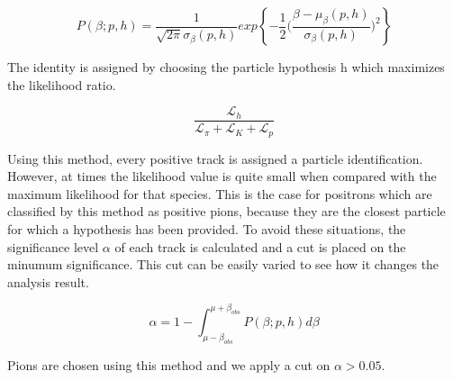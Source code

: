 \begin{equation}
  P(\beta;p,h) = \frac{1}{\sqrt{2 \pi} \sigma_\beta(p,h) } exp \left \{ -\frac{1}{2} \bigg( \frac{\beta - \mu_\beta(p,h)}{\sigma_\beta(p,h)} \bigg)^2 \right \}
\end{equation}

The identity is assigned by choosing the particle hypothesis h which maximizes the likelihood ratio.

\begin{equation}
  \frac{\mathcal{L}_h}{\mathcal{L}_{\pi}+\mathcal{L}_{K}+\mathcal{L}_{p}}
\end{equation}

Using this method, every positive track is assigned a particle identification.  However, at times the likelihood value is quite small when compared with the maximum likelihood for that species.  This is the case for positrons which are classified by this method as positive pions, because they are the closest particle for which a hypothesis has been provided.  To avoid these situations, the significance level $\alpha$ of each track is calculated and a cut is placed on the minumum significance.  This cut can be easily varied to see how it changes the analysis result.

\begin{equation}
  \alpha = 1 - \int_{\mu-\beta_{obs}}^{\mu+\beta_{obs}} P(\beta;p,h) d\beta
\end{equation}


Pions are chosen using this method and we apply a cut on $\alpha > 0.05$.  



